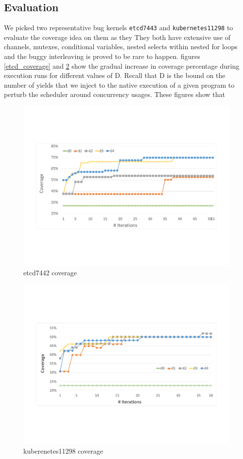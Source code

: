 


\subsection{Evaluation}
We picked two representative bug kernels \texttt{etcd7443} and \texttt{kubernetes11298} to evaluate the coverage idea on them as they
%
They both have extensive use of channels, mutexes, conditional variables, nested selects within nested for loops and the buggy interleaving is proved to be rare to happen.
%
figures \ref{etcd_coverage} and \ref{fig:kubernetes_coverage} show the gradual increase in coverage percentage during execution runs for different values of D.
%
Recall that D is the bound on the number of yields that we inject to the native execution of a given program to perturb the scheduler around concurrency usages.
%
These figures show that
%

\begin{figure}
\centering
  \includegraphics[width=.95\linewidth]{figs/coverage_etcd7443.pdf}
  \caption{etcd7442 coverage}
  \label{fig:etcd_coverage}
\end{figure}


\begin{figure}
\centering
  \includegraphics[width=.95\linewidth]{figs/coverage_kubernetes11298.pdf}
  \caption{kuberenetes11298 coverage}
  \label{fig:kubernetes_coverage}
\end{figure}
